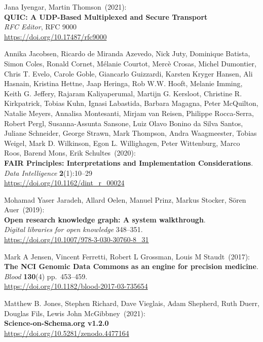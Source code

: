 \begin{thebibliography}{9}
Jana Iyengar, Martin Thomson~(2021): \\
\textbf{{QUIC}: {A UDP-Based Multiplexed} and {Secure Transport}}\\
\emph{RFC Editor}, RFC 9000\\
\url{https://doi.org/10.17487/rfc9000}


Annika Jacobsen, Ricardo de Miranda Azevedo, Nick Juty, Dominique Batista, Simon Coles, Ronald Cornet, Mélanie Courtot, Mercè Crosas, Michel Dumontier, Chris T. Evelo, Carole Goble, Giancarlo Guizzardi, Karsten Kryger Hansen, Ali Hasnain, Kristina Hettne, Jaap Heringa, Rob W.W. Hooft, Melanie Imming, Keith G. Jeffery, Rajaram Kaliyaperumal, Martijn G. Kersloot, Christine R. Kirkpatrick, Tobias Kuhn, Ignasi Labastida, Barbara Magagna, Peter McQuilton, Natalie Meyers, Annalisa Montesanti, Mirjam van Reisen, Philippe Rocca-Serra, Robert Pergl, Susanna-Assunta Sansone, Luiz Olavo Bonino da Silva Santos, Juliane Schneider, George Strawn, Mark Thompson, Andra Waagmeester, Tobias Weigel, Mark D. Wilkinson, Egon L. Willighagen, Peter Wittenburg, Marco Roos, Barend Mons, Erik Schultes~(2020): \\
\textbf{FAIR Principles: Interpretations and Implementation Considerations}.\\
\emph{Data Intelligence} \textbf{2}(1):10--29\\
\url{https://doi.org/10.1162/dint_r_00024}

Mohamad Yaser Jaradeh, Allard Oelen, Manuel Prinz, Markus Stocker, Sören Auer~(2019): \\
\textbf{Open research knowledge graph: A system walkthrough}. \\
\emph{Digital libraries for open knowledge} 348--351.\\
\url{https://doi.org/10.1007/978-3-030-30760-8_31}

Mark A Jensen, Vincent Ferretti, Robert L Grossman, Louis M
Staudt~(2017): \\
\textbf{The NCI Genomic Data Commons as an engine for precision
medicine}.\\
\emph{Blood} \textbf{130}(4) pp.~453--459.\\
\url{https://doi.org/10.1182/blood-2017-03-735654}

Matthew B. Jones, Stephen Richard, Dave Vieglais, Adam
Shepherd, Ruth Duerr, Douglas Fils, Lewis John McGibbney~(2021): \\
\textbf{Science-on-Schema.org v1.2.0}\\
\url{https://doi.org/10.5281/zenodo.4477164}


\end{thebibliography}
